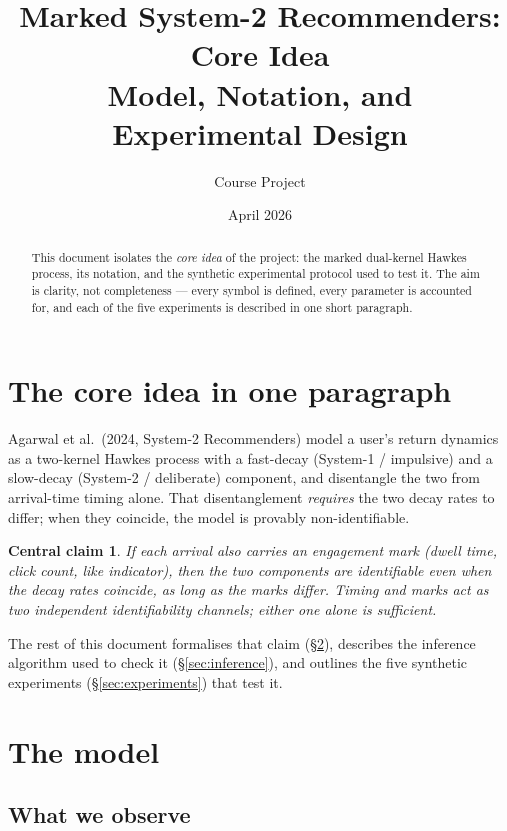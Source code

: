 \documentclass[11pt]{article}
\title{\textbf{Marked System-2 Recommenders: Core Idea}\\[0.4em]
\large Model, Notation, and Experimental Design}
\author{Course Project}
\date{April 2026}
\newtheorem*{claim}{Central claim}
\begin{document}
\maketitle

\begin{abstract}
This document isolates the \emph{core idea} of the project: the marked dual-kernel Hawkes process, its notation, and the synthetic experimental protocol used to test it. The aim is clarity, not completeness --- every symbol is defined, every parameter is accounted for, and each of the five experiments is described in one short paragraph.
\end{abstract}

\section{The core idea in one paragraph}

Agarwal et al.~(2024, System-2 Recommenders) model a user's return dynamics as a two-kernel Hawkes process with a fast-decay (System-1 / impulsive) and a slow-decay (System-2 / deliberate) component, and disentangle the two from arrival-time timing alone. That disentanglement \emph{requires} the two decay rates to differ; when they coincide, the model is provably non-identifiable.

\begin{claim}
If each arrival also carries an engagement mark (dwell time, click count, like indicator), then the two components are identifiable even when the decay rates coincide, as long as the marks differ. Timing and marks act as two \emph{independent} identifiability channels; either one alone is sufficient.
\end{claim}

The rest of this document formalises that claim (\S\ref{sec:model}), describes the inference algorithm used to check it (\S\ref{sec:inference}), and outlines the five synthetic experiments (\S\ref{sec:experiments}) that test it.

\section{The model}
\label{sec:model}

\subsection{What we observe}
\end{document}
